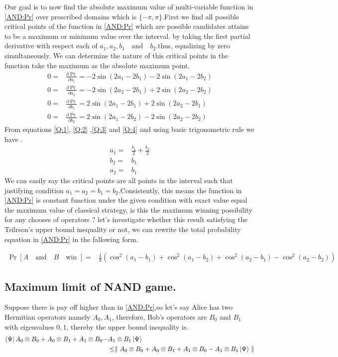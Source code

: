 Our goal is to now find the absolute maximum  value of multi-variable function in \ref{AND:Pr} over prescribed domains which is $\{-\pi,\pi\}$.First we find  all possible critical points of the function in \ref{AND:Pr} which are possible candidates  attains to be a maximum or minimum value over the interval. by taking the first partial derivative with respect each of $a_1,a_2,b_1 \quad \text{and} \quad b_2$.thus, equalizing by zero simultaneously. We can determine the nature of this critical points in the function take the maximum as the absolute maximum point.
\begin{align}
0=&\frac{\partial \Pr}{\partial a_1}=-2\sin(2a_1-2b_1)- 2\sin(2a_1-2b_2)\label{Q:1}\\
0=&\frac{\partial \Pr}{\partial a_2}=-2\sin(2a_2-2b_1)+2\sin(2a_2-2b_2)\label{Q:2}\\
0=&\frac{\partial \Pr}{\partial b_1}=2\sin(2a_1-2b_1)+ 2\sin(2a_2-2b_1)\label{Q:3}\\
0=&\frac{\partial \Pr}{\partial b_2}=2\sin(2a_1-2b_2)- 2\sin(2a_2-2b_2)\label{Q:4}
\end{align}
From equations \ref{Q:1}, \ref{Q:2} ,\ref{Q:3} and \ref{Q:4} and using basic trigonometric rule  we have .
\begin{align}
a_1=&\frac{b_1}{2}+\frac{b_2}{2}\label{QQ:1}\\
b_2=&b_1\label{QQ:2}\\
a_2=&b_1\label{QQ:3}
\end{align} 
We can easily say the critical points are all points in the interval such  that justifying  condition $a_1=a_2= b_1=b_2$.Consistently,  this means the function in \ref{AND:Pr} is constant function under the given condition with exact value equal the maximum value of classical strategy, is this the maximum winning possibility for any chooses of operators ? let's investigate whether this result satisfying the Tsilrson's upper bound inequality or not, we can rewrite the total probability equation in \ref{AND:Pr} in the fallowing form.

\begin{align}\label{NAND:Pr}
\Pr[A\quad \text{and}\quad B \quad \text{win }  ]=&\frac{1}{8}\left( \cos^2(a_1-b_1)+\cos^2(a_1-b_2)
+\cos^2(a_2-b_1)-\cos^2(a_2-b_2)\right)
\end{align}
\subsection{Maximum limit of NAND game.}
Suppose  there is pay off higher than  in \ref{AND:Pr},so let's say Alice has two Hermitian  operators  namely $A_0 ,A_1$, therefore, Bob's operators are $B_0$ and $B_1$  with eigenvalues $0,1$, thereby the upper bound inequality is.
\begin{align}\label{GGG}
\bra{\Psi} A_0\otimes B_0+A_0\otimes B_1+A_1\otimes B_0-& A_1\otimes B_1 \ket{\Psi}\nonumber\\
& \leq \parallel A_0\otimes B_0+A_0\otimes B_1+A_1\otimes B_0-A_1\otimes B_1 \ket{\Psi} \parallel
\end{align}


